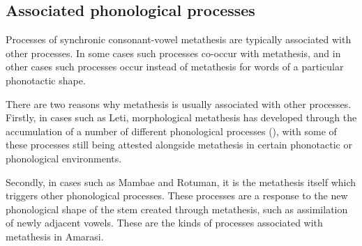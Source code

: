 \subsection{Associated phonological processes}
Processes of synchronic consonant-vowel metathesis are typically associated with other processes.
In some cases such processes co-occur with metathesis,
and in other cases such processes occur instead of metathesis
for words of a particular phonotactic shape.

There are two reasons why metathesis is usually associated with other processes.
Firstly, in cases such as Leti,
morphological metathesis has developed through the accumulation
of a number of different phonological processes (),
with some of these processes still being attested alongside metathesis
in certain phonotactic or phonological environments.

Secondly, in cases such as Mambae and Rotuman,
it is the metathesis itself which triggers other phonological processes.
These processes are a response to the new phonological shape
of the stem created through metathesis, such as
assimilation of newly adjacent vowels.
These are the kinds of processes associated with metathesis in Amarasi.

